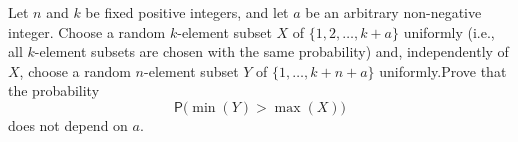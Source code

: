 \documentclass{article}
\begin{document}
\setlength{\parindent}{0pt}
Let \(\displaystyle n\) and \(\displaystyle k\) be fixed positive integers, and let \(\displaystyle a\) be an arbitrary non-negative integer. Choose a random \(\displaystyle k\)-element subset \(\displaystyle X\) of \(\displaystyle \{1,2,\ldots,k+a\}\) uniformly (i.e., all \(\displaystyle k\)-element subsets are chosen with the same probability) and, independently of \(\displaystyle X\), choose a random \(\displaystyle n\)-element subset \(\displaystyle Y\) of \(\displaystyle \{1,\ldots,k+n+a\}\) uniformly.\newline Prove that the probability$$\mathsf{P}\Big(\min(Y)>\max(X)\Big)$$does not depend on \(\displaystyle a\).
\end{document}
